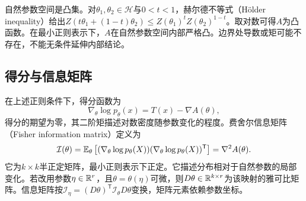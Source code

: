 自然参数空间是凸集。对$\theta_1,\theta_2\in\mathcal H$与$0<t<1$，赫尔德不等式（Hölder inequality）给出$Z(t\theta_1+(1-t)\theta_2)\leq Z(\theta_1)^tZ(\theta_2)^{1-t}$。取对数可得$A$为凸函数。在最小正则表示下，$A$在自然参数空间内部严格凸。边界处导数或矩可能不存在，不能无条件延伸内部结论。

\subsection{得分与信息矩阵}
在上述正则条件下，得分函数为
\begin{equation}
 \nabla_\theta\log p_\theta(x)=T(x)-\nabla A(\theta),
\end{equation}
得分的期望为零，其二阶矩描述对数密度随参数变化的程度。费舍尔信息矩阵（Fisher information matrix）定义为
\begin{equation}
 \mathcal I(\theta)=\mathbb{E}_\theta\left[
 (\nabla_\theta\log p_\theta(X))(\nabla_\theta\log p_\theta(X))^{\mathsf T}\right]
 =\nabla^2A(\theta).
\end{equation}
它为$k\times k$半正定矩阵，最小正则表示下正定。它描述分布相对于自然参数的局部变化。若改用参数$\eta\in\mathbb{R}^r$，且$\theta=\theta(\eta)$可微，则$D\theta\in\mathbb{R}^{k\times r}$为该映射的雅可比矩阵。信息矩阵按$\mathcal I_\eta=(D\theta)^{\mathsf T}\mathcal I_\theta D\theta$变换，矩阵元素依赖参数坐标。

